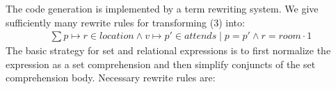 \documentclass[runningheads]{llncs}
\begin{document}
The code generation is implemented by a term rewriting system. We give sufficiently many rewrite rules for transforming (3) into:
\begin{align}
\sum p \mapsto r \in location \land v \mapsto p' \in attends \mid p = p' \land r = room \cdot 1
\end{align}
The basic strategy for set and relational expressions is to first normalize the expression as a set comprehension and then simplify conjuncts of the set comprehension body.
Necessary rewrite rules are:
\end{document}
